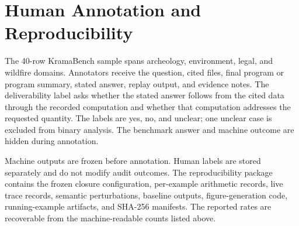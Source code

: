 \section{Human Annotation and Reproducibility}
\label{app:human}

The 40-row KramaBench sample spans archeology, environment, legal,
and wildfire domains. Annotators receive the question, cited files,
final program or program summary, stated answer, replay output, and
evidence notes. The deliverability label asks whether the stated
answer follows from the cited data through the recorded computation
and whether that computation addresses the requested quantity.
The labels are yes, no, and unclear; one unclear case is excluded
from binary analysis. The benchmark answer and machine outcome are
hidden during annotation.

Machine outputs are frozen before annotation. Human labels are
stored separately and do not modify audit outcomes. The
reproducibility package contains the frozen closure configuration,
per-example arithmetic records, live trace records, semantic
perturbations, baseline outputs, figure-generation code, running-example
artifacts, and SHA-256 manifests. The reported rates are recoverable
from the machine-readable counts listed above.
